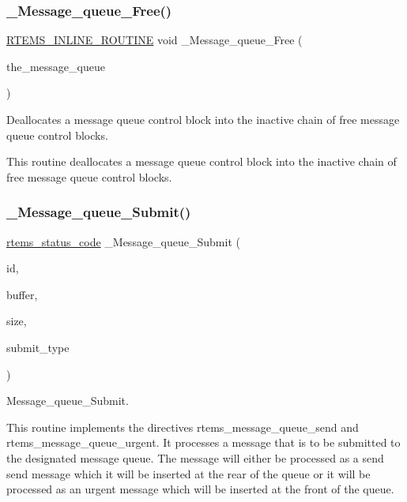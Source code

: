 \subsubsection{\texorpdfstring{\_Message\_queue\_Free()}{\_Message\_queue\_Free()}}
{\footnotesize\ttfamily \mbox{\hyperlink{group__RTEMSScoreBaseDefs_gac216239df231d5dbd15e3520b0b9313f}{R\+T\+E\+M\+S\+\_\+\+I\+N\+L\+I\+N\+E\+\_\+\+R\+O\+U\+T\+I\+NE}} void \+\_\+\+Message\+\_\+queue\+\_\+\+Free (\begin{DoxyParamCaption}\item[{\mbox{\hyperlink{structMessage__queue__Control}{Message\+\_\+queue\+\_\+\+Control}} $\ast$}]{the\+\_\+message\+\_\+queue }\end{DoxyParamCaption})}



Deallocates a message queue control block into the inactive chain of free message queue control blocks. 

This routine deallocates a message queue control block into the inactive chain of free message queue control blocks. \mbox{\label{group__ClassicMessageQueueImpl_ga9b81aed474d2572b973f79d94dddacc5}} 
\subsubsection{\texorpdfstring{\_Message\_queue\_Submit()}{\_Message\_queue\_Submit()}}
{\footnotesize\ttfamily \mbox{\hyperlink{group__ClassicStatus_ga545d41846817eaba6143d52ee4d9e9fe}{rtems\+\_\+status\+\_\+code}} \+\_\+\+Message\+\_\+queue\+\_\+\+Submit (\begin{DoxyParamCaption}\item[{\mbox{\hyperlink{group__ClassicTasks_gab20892b814dced7dd4e5b9bf42becd57}{rtems\+\_\+id}}}]{id,  }\item[{const void $\ast$}]{buffer,  }\item[{size\+\_\+t}]{size,  }\item[{\mbox{\hyperlink{group__ClassicMessageQueueImpl_ga488f0920d255344bbb3b76a23ad3ecc7}{Message\+\_\+queue\+\_\+\+Submit\+\_\+types}}}]{submit\+\_\+type }\end{DoxyParamCaption})}



Message\+\_\+queue\+\_\+\+Submit. 

This routine implements the directives rtems\+\_\+message\+\_\+queue\+\_\+send and rtems\+\_\+message\+\_\+queue\+\_\+urgent. It processes a message that is to be submitted to the designated message queue. The message will either be processed as a send send message which it will be inserted at the rear of the queue or it will be processed as an urgent message which will be inserted at the front of the queue. 